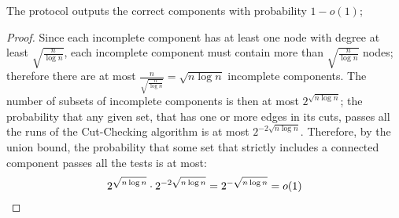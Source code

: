 \begin{theorem}
    The protocol outputs the correct components with probability $1 - o(1)$; 
\end{theorem}

\begin{proof}
    Since each incomplete component has at least one node with degree at least $\sqrt{\frac{n}{\log n}}$, each incomplete component must contain more than $\sqrt{\frac{n}{\log n}}$ nodes; therefore there are at most $\frac{n}{\sqrt {\frac{n}{\log n}}} = \sqrt{n \log n}$ incomplete components. The number of subsets of incomplete components is then at most $2^{\sqrt{n \log n}}$; the probability that any given set, that has one or more edges in its cuts, passes all the runs of the Cut-Checking algorithm is at most $2^{-2\sqrt{n \log n}}$. Therefore, by the union bound, the probability that some set that strictly includes a connected component passes all the tests is at most:
    \[
        2^{\sqrt{n \log n}} \cdot 2^{-2\sqrt{n \log n}} = 2^{-\sqrt{n \log n}} = o(1) \qedhere
    \]
\end{proof}